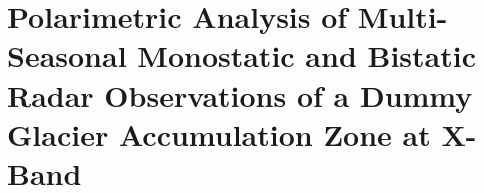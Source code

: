
\chapter[Polarimetric Analysis]{Polarimetric Analysis of Multi-Seasonal Monostatic
and Bistatic Radar Observations of a Dummy Glacier Accumulation Zone at X-Band}



